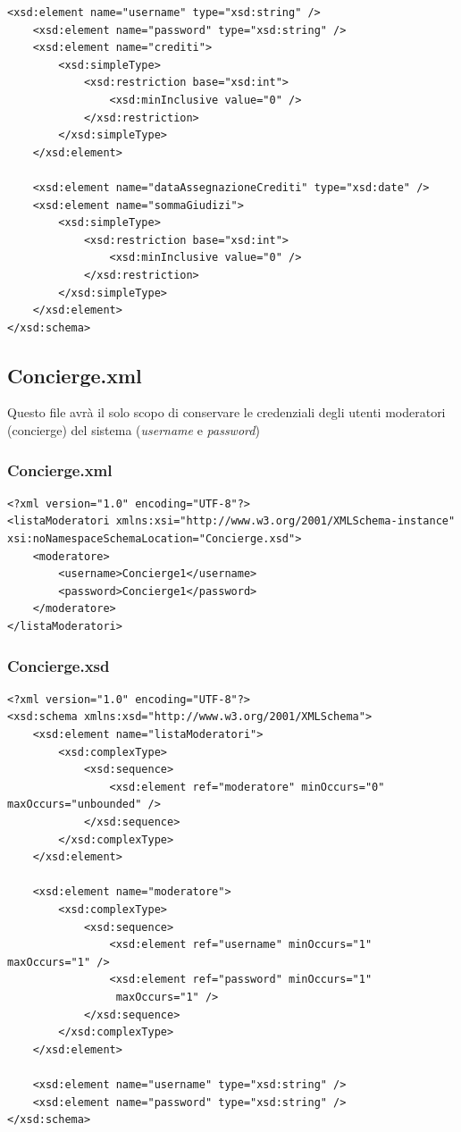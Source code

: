 \documentclass [a4paper, 12pt]{book}
\begin{document}
\begin{lstlisting}[style=XML]
    <xsd:element name="username" type="xsd:string" />
    <xsd:element name="password" type="xsd:string" />
    <xsd:element name="crediti">
        <xsd:simpleType>
            <xsd:restriction base="xsd:int">
                <xsd:minInclusive value="0" />
            </xsd:restriction>
        </xsd:simpleType>
    </xsd:element>

    <xsd:element name="dataAssegnazioneCrediti" type="xsd:date" />
    <xsd:element name="sommaGiudizi">
        <xsd:simpleType>
            <xsd:restriction base="xsd:int">
                <xsd:minInclusive value="0" />
            </xsd:restriction>
        </xsd:simpleType>
    </xsd:element>
</xsd:schema>

\end{lstlisting}

\subsection{Concierge.xml}
Questo file avrà il solo scopo di conservare le credenziali degli utenti moderatori (concierge) del sistema (\textit{username} e \textit{password})

\subsubsection{Concierge.xml}
\begin{lstlisting}[style=XML]
<?xml version="1.0" encoding="UTF-8"?>
<listaModeratori xmlns:xsi="http://www.w3.org/2001/XMLSchema-instance" xsi:noNamespaceSchemaLocation="Concierge.xsd">
    <moderatore>
        <username>Concierge1</username>
        <password>Concierge1</password>
    </moderatore>
</listaModeratori>
\end{lstlisting}
\subsubsection{Concierge.xsd}
\begin{lstlisting}[style=XML]
<?xml version="1.0" encoding="UTF-8"?>
<xsd:schema xmlns:xsd="http://www.w3.org/2001/XMLSchema">
    <xsd:element name="listaModeratori">
        <xsd:complexType>
            <xsd:sequence>
                <xsd:element ref="moderatore" minOccurs="0" maxOccurs="unbounded" />
            </xsd:sequence>
        </xsd:complexType>
    </xsd:element>

    <xsd:element name="moderatore">
        <xsd:complexType>
            <xsd:sequence>
                <xsd:element ref="username" minOccurs="1" maxOccurs="1" />
                <xsd:element ref="password" minOccurs="1"
                 maxOccurs="1" />
            </xsd:sequence>
        </xsd:complexType>
    </xsd:element>

    <xsd:element name="username" type="xsd:string" />
    <xsd:element name="password" type="xsd:string" />
</xsd:schema>
\end{lstlisting}
\end{document}
